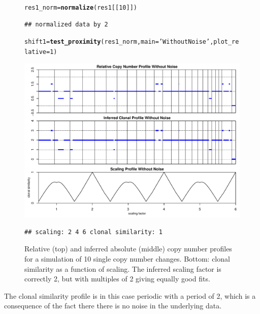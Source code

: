 \documentclass[12pt]{article}\usepackage[]{graphicx}\usepackage[]{color}
\makeatletter
\newcommand{\hlnum}[1]{\textcolor[rgb]{0.686,0.059,0.569}{#1}}%
\newcommand{\hlstr}[1]{\textcolor[rgb]{0.192,0.494,0.8}{#1}}%
\newcommand{\hlstd}[1]{\textcolor[rgb]{0.345,0.345,0.345}{#1}}%
\newcommand{\hlkwb}[1]{\textcolor[rgb]{0.69,0.353,0.396}{#1}}%
\newcommand{\hlkwc}[1]{\textcolor[rgb]{0.333,0.667,0.333}{#1}}%
\newcommand{\hlkwd}[1]{\textcolor[rgb]{0.737,0.353,0.396}{\textbf{#1}}}%
\newenvironment{kframe}{%
 \def\at@end@of@kframe{}%
 \ifinner\ifhmode%
  \def\at@end@of@kframe{\end{minipage}}%
  \begin{minipage}{\columnwidth}%
 \fi\fi%
 \def\FrameCommand##1{\hskip\@totalleftmargin \hskip-\fboxsep
 \colorbox{shadecolor}{##1}\hskip-\fboxsep
     \hskip-\linewidth \hskip-\@totalleftmargin \hskip\columnwidth}%
 \MakeFramed {\advance\hsize-\width
   \@totalleftmargin\z@ \linewidth\hsize
   \@setminipage}}%
 {\par\unskip\endMakeFramed%
 \at@end@of@kframe}
\newenvironment{knitrout}{}{} %
\makeatother
\begin{document}
\begin{figure}[h!]
  \centering
\begin{knitrout}
\color{fgcolor}\begin{kframe}
\begin{alltt}
\hlstd{res1_norm} \hlkwb{=} \hlkwd{normalize}\hlstd{(res1[[}\hlnum{10}\hlstd{]])}
\end{alltt}
\begin{verbatim}
## normalized data by 2
\end{verbatim}
\begin{alltt}
\hlstd{shift1} \hlkwb{=} \hlkwd{test_proximity}\hlstd{(res1_norm,} \hlkwc{main} \hlstd{=} \hlstr{'Without Noise'}\hlstd{,} \hlkwc{plot_relative}\hlstd{=}\hlnum{1}\hlstd{)}
\end{alltt}
\end{kframe}
\includegraphics[width=.95\linewidth]{figure/unnamed-chunk-9-1} 
\begin{kframe}\begin{verbatim}
## scaling: 2 4 6 clonal similarity: 1
\end{verbatim}
\end{kframe}
\end{knitrout}
\caption{Relative (top) and inferred absolute (middle) copy number profiles for a simulation of 10 single copy number changes. Bottom: clonal similarity as a function of scaling. The inferred scaling factor is correctly 2, but with multiples of 2 giving equally good fits.}
\label{fig:rel_nonoise}
\end{figure}

The clonal similarity profile is in this case periodic with a period of 2, which is a consequence of the fact there there is no noise in the underlying data.
\end{document}
